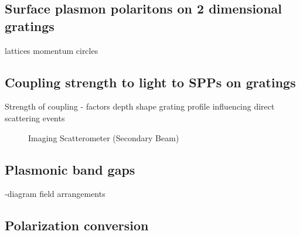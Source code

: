 \documentclass[oneside,10pt,a4paper]{book}
\begin{document}
\subsection{Surface plasmon polaritons on 2 dimensional gratings}
lattices
momentum circles 

\subsection{Coupling strength to light to SPPs on gratings}
Strength of coupling - factors
depth
shape
grating profile influencing direct scattering events

\begin{figure}
\centering
		\centering
		\centering
	\caption{Imaging Scatterometer (Secondary Beam)\label{fig:diffractive-coupling}}
\end{figure}

\subsection{Plasmonic band gaps}
-diagram field arrangements

\subsection{Polarization conversion}
\end{document}
